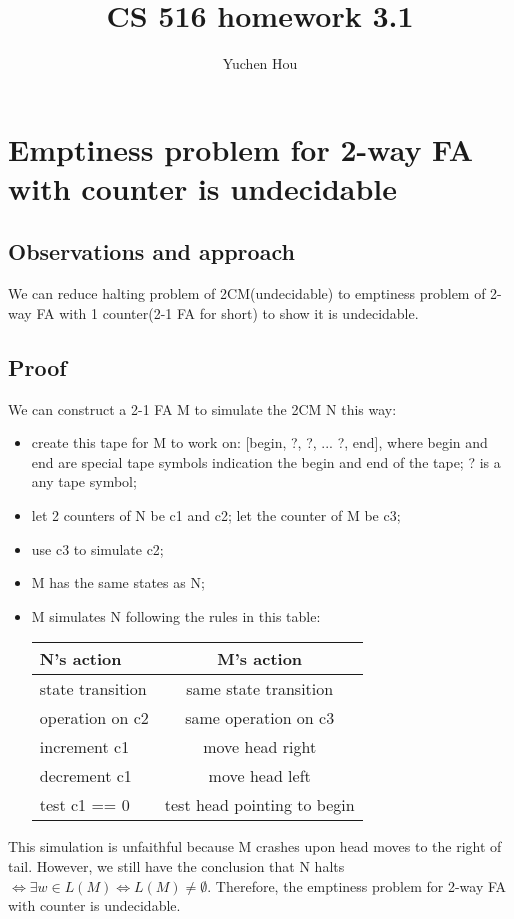 \documentclass{article}
\begin{document}
\lstset{language=python, tabsize=4}
\title{CS 516 homework 3.1}
\author{Yuchen Hou}
\maketitle

\section{Emptiness problem for 2-way FA with counter is undecidable}

\subsection{Observations and approach}
We can reduce halting problem of 2CM(undecidable) to emptiness problem of 2-way FA with 1 counter(2-1 FA for short) to show it is undecidable.

\subsection{Proof}
We can construct a 2-1 FA M to simulate the 2CM N this way:
\begin{itemize}
	\item create this tape for M to work on: [begin, ?, ?, ... ?, end], where begin and end are special tape symbols indication the begin and end of the tape; ? is a any tape symbol;
	\item let 2 counters of N be c1 and c2; let the counter of M be c3;
	\item use c3 to simulate c2;
	\item M has the same states as N;
	\item M simulates N following the rules in this table:
		
	\begin{tabularx}{0.5\textwidth}{|X|c|}  \hline
		 N's action & M's action \\ \hline
		 state transition & same state transition \\ \hline
		 operation on c2 & same operation on c3 \\ \hline
		 increment c1 & move head right \\ \hline
		 decrement c1 & move head left \\ \hline
		 test c1 == 0 & test head pointing to begin \\ \hline
	\end{tabularx}
\end{itemize}
This simulation is unfaithful because M crashes upon head moves to the right of tail. However, we still have the conclusion that N halts $ \iff \exists w \in L(M) \iff L(M) \neq \emptyset$. Therefore, the emptiness problem for 2-way FA with counter is undecidable.
\end{document}
